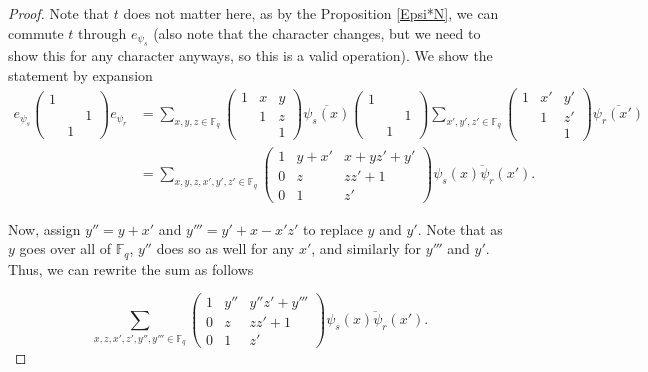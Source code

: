 \documentclass[12pt,reqno]{amsart}
\theoremstyle{definition}
\theoremstyle{remark}
\numberwithin{equation}{section}
\begin{document}
\begin{proof}
    Note that $t$ does not matter here, as by the Proposition \ref{Epsi*N}, we can commute $t$ through $e_{\psi_s}$ (also note that the character changes, but we need to show this for any character anyways, so this is a valid operation). We show the statement by expansion
        \begin{align*}
        e_{\psi_s}
        \begin{pmatrix}
            1 & &\\
            &  & 1\\
            & 1 & 
        \end{pmatrix} e_{\psi_r} &= 
        \sum_{x, y, z \in \mathbb{F}_q}
        \begin{pmatrix}
            1 & x & y\\
            & 1 & z\\
            & & 1
        \end{pmatrix} \overline{\psi_s(x)}
        \begin{pmatrix}
            1 & &\\
            & & 1\\
            & 1 &
        \end{pmatrix}
        \sum_{x', y', z' \in \mathbb{F}_q}
        \begin{pmatrix}
            1 & x' & y'\\
            & 1 & z'\\
            & & 1
        \end{pmatrix} \overline{\psi_r(x')}\\
        &=
        \sum_{x, y, z, x', y', z' \in \mathbb{F}_q}
        \begin{pmatrix}
            1 & y + x' & x+ yz'+y'\\
            0 & z & zz'+1\\
            0 & 1 & z'
        \end{pmatrix}
        \overline{\psi_s(x) \psi_r(x')}.
    \end{align*}

    Now, assign $y'' = y + x'$ and $y''' = y'+x-x'z'$ to replace $y$ and $y'$. Note that as $y$ goes over all of $\mathbb{F}_q$, $y''$ does so as well for any $x'$, and similarly for $y'''$ and $y'$. Thus, we can rewrite the sum as follows

    \begin{equation*}
        \sum_{x, z, x', z', y'', y''' \in \mathbb{F}_q}
        \begin{pmatrix}
            1 & y'' & y''z'+y'''\\
            0 & z & zz'+1\\
            0 & 1 & z'
        \end{pmatrix}
        \overline{\psi_s(x) \psi_r(x')}.
    \end{equation*}


\end{proof}
\end{document}
